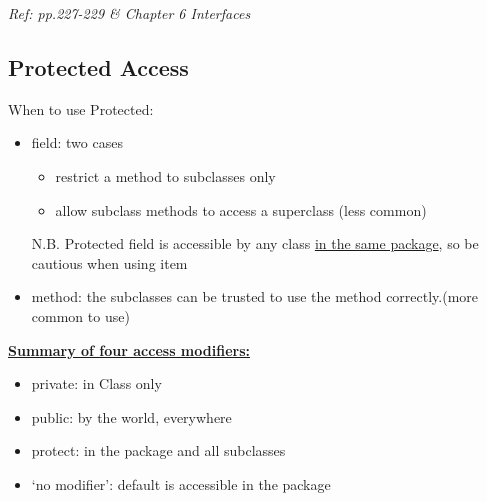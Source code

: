 \documentclass[12pt]{article}
\begin{document}
\textit{Ref: pp.227-229 \& Chapter 6 Interfaces}

\subsection{Protected Access}
When to use Protected:
\begin{itemize}
    \item field: two cases
    \begin{itemize}
        \item restrict a method to subclasses only
        \item allow subclass methods to access a superclass (less common)
    \end{itemize}
    N.B. Protected field is accessible by any class \underline{in the same package}, so be cautious when using item
    \item method: the subclasses can be trusted to use the method correctly.(more common to use)
\end{itemize}

\underline{\textbf{Summary of four access modifiers:}}
\begin{itemize}
    \item private: in Class only
    \item public: by the world, everywhere
    \item protect: in the package and all subclasses
    \item `no modifier': default is accessible in the package 
\end{itemize}
\end{document}
